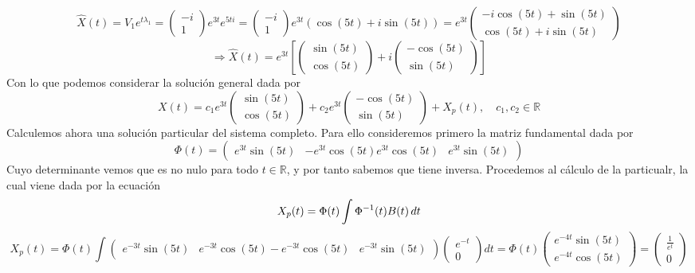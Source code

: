 \documentclass[fleqn]{article}
\def\R{\mathds{R}}
\begin{document}
    $$\hat{X}(t) = V_1e^{t\lambda_1} = \begin{pmatrix} -i \\ 1 \end{pmatrix} e^{3t} e^{5ti} = \begin{pmatrix} -i \\ 1 \end{pmatrix} e^{3t} (\cos(5t) + i\sin(5t))=
    e^{3t}
    \begin{pmatrix}
        -i\cos(5t) + \sin(5t)\\
        \cos(5t) + i\sin(5t)   
    \end{pmatrix}    
    $$
    $$
    \Rightarrow \hat{X}(t) = e^{3t} \left[
    \begin{pmatrix}
        \sin(5t) \\
        \cos(5t)
    \end{pmatrix}
    +i
    \begin{pmatrix}
        -\cos(5t)\\
        \sin(5t)
    \end{pmatrix}
    \right]
    $$
    Con lo que podemos considerar la solución general dada por 
    $$
    X(t) = 
    c_1e^{3t}
    \begin{pmatrix}
        \sin(5t) \\
        \cos(5t)
    \end{pmatrix}
    +c_2e^{3t}
    \begin{pmatrix}
        -\cos(5t)\\
        \sin(5t)
    \end{pmatrix}
    +X_p(t), \quad c_1,c_2 \in \R
    $$
    Calculemos ahora una solución particular del sistema completo. Para ello consideremos primero la matriz fundamental dada por 
    $$\Phi(t)=
    \begin{pmatrix}
        e^{3t}\sin(5t) & -e^{3t}\cos(5t)
        e^{3t}\cos(5t) & e^{3t}\sin(5t)
    \end{pmatrix}
    $$
    Cuyo determinante vemos que es no nulo para todo $t\in\R$, y por tanto sabemos que tiene inversa. Procedemos al cálculo de la particualr, la cual viene dada por la ecuación
    $$X_p(t) = \Phi(t) \int \Phi^{-1}(t)B(t) \thinspace dt$$
    $$X_p(t) = \Phi(t) \int 
    \begin{pmatrix}
        e^{-3t}\sin(5t) & e^{-3t}\cos(5t)
        -e^{-3t}\cos(5t) & e^{-3t}\sin(5t)
    \end{pmatrix}
    \begin{pmatrix}
        e^{-t} \\ 0
    \end{pmatrix}
    dt = \Phi(t)
    \begin{pmatrix}
        e^{-4t}\sin(5t) \\ e^{-4t}\cos(5t)
    \end{pmatrix}
    =
    \begin{pmatrix}
        \frac{1}{e^{t}} \\ 0
    \end{pmatrix}
    $$
\end{document}
